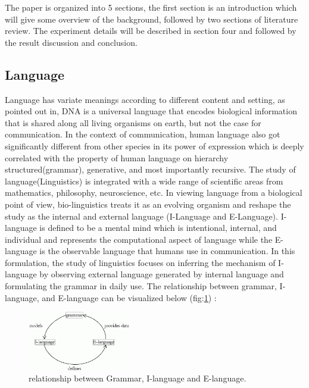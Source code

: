 \documentclass[12pt]{article}
\begin{document}
The paper is organized into 5 sections, the first section is an introduction which will give some overview of the background, followed by two sections of literature review. The experiment details will be described in section four and followed by the result discussion and conclusion.

\subsection{Language} \label{introLanguage}
Language has variate meanings according to different content and setting, as pointed out in\cite{Hauser_2002}, DNA is a universal language that encodes biological information that is shared along all living organisms on earth, but not the case for communication. In the context of communication, human language also got significantly different from other species in its power of expression which is deeply correlated with the property of human language on hierarchy structured(grammar), generative, and most importantly recursive\cite{Hauser_2002}.  The study of language(Linguistics) is integrated with a wide range of scientific areas from mathematics, philosophy, neuroscience, etc\cite{Gallego_2022}. In viewing language from a biological point of view, bio-linguistics treats it as an evolving organism and reshape the study as the internal and external language (I-Language and E-Language)\cite{Gallego_2022}.  I-language is defined to be a mental mind which is intentional, internal, and individual and represents the computational aspect of language while the E-language is the observable language that humans use in communication\cite{Gallego_2022, Hauser_2002}.  
In this formulation, the study of linguistics focuses on inferring the mechanism of  I-language by observing external language generated by internal language and formulating the grammar in daily use. 
The relationship between grammar, I-language, and E-language can be visualized below (fig:\ref{fig:ilanguage}) \cite{Mark_2006}:
\begin{figure} [!h]
\begin{center}
\includegraphics[width=0.4\textwidth]{figures/iLanguage_eLanguage.png}
\caption{relationship between Grammar, I-language and E-language.}
\label{fig:ilanguage}
\end{center}
\end{figure}
\end{document}

